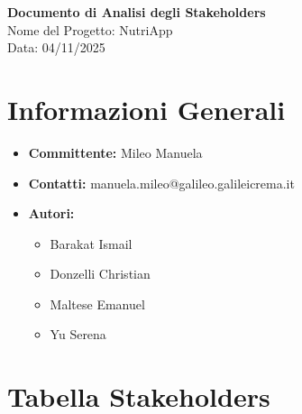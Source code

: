 \documentclass[11pt,a4paper]{article}
\begin{document}
    \begin{center}
        {\Large \textbf{Documento di Analisi degli Stakeholders}} \\
        \vspace{0.5cm}
        Nome del Progetto: NutriApp \\
        Data: 04/11/2025
    \end{center}

    \section*{Informazioni Generali}

    \begin{itemize}
        \item \textbf{Committente:} Mileo Manuela
        \item \textbf{Contatti:} manuela.mileo@galileo.galileicrema.it
        \item \textbf{Autori:}

        \begin{itemize}
            \item Barakat Ismail
            \item Donzelli Christian
            \item Maltese Emanuel
            \item Yu Serena
        \end{itemize}

    \end{itemize}

    \section*{Tabella Stakeholders}
\end{document}
